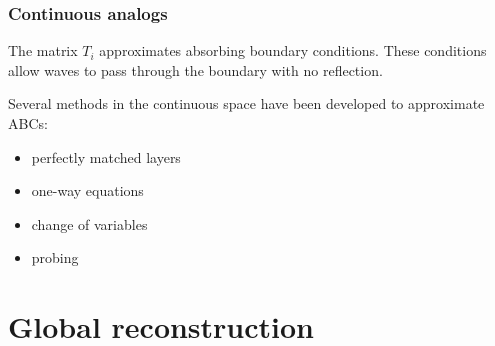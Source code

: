 \documentclass{beamer}
\begin{document}
\begin{frame}
\frametitle{Continuous analogs}

The matrix $T_i$ approximates absorbing boundary conditions.
These conditions allow waves to pass through the boundary with no reflection.

Several methods in the continuous space have been developed to approximate ABCs:
\begin{itemize}
\item perfectly matched layers
\item one-way equations
\item change of variables
\item probing
\end{itemize}

\end{frame}

\section{Global reconstruction}
\end{document}
